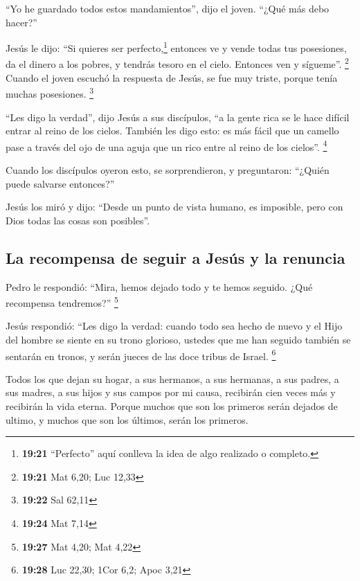  ``Yo he guardado todos estos mandamientos'', dijo el
joven. ``¿Qué más debo hacer?''

 Jesús le dijo: ``Si quieres ser perfecto,\footnote{\textbf{19:21}
  ``Perfecto'' aquí conlleva la idea de algo realizado o completo.}
entonces ve y vende todas tus posesiones, da el dinero a los pobres, y
tendrás tesoro en el cielo. Entonces ven y sígueme''. \footnote{\textbf{19:21}
  Mat 6,20; Luc 12,33}  Cuando el joven escuchó la
respuesta de Jesús, se fue muy triste, porque tenía muchas posesiones.
\footnote{\textbf{19:22} Sal 62,11}

 ``Les digo la verdad'', dijo Jesús a sus discípulos, ``a
la gente rica se le hace difícil entrar al reino de los cielos.
 También les digo esto: es más fácil que un camello pase
a través del ojo de una aguja que un rico entre al reino de los
cielos''. \footnote{\textbf{19:24} Mat 7,14}

 Cuando los discípulos oyeron esto, se sorprendieron, y
preguntaron: ``¿Quién puede salvarse entonces?''

 Jesús los miró y dijo: ``Desde un punto de vista humano,
es imposible, pero con Dios todas las cosas son posibles''.

\hypertarget{la-recompensa-de-seguir-a-jesuxfas-y-la-renuncia}{%
\subsection{La recompensa de seguir a Jesús y la
renuncia}\label{la-recompensa-de-seguir-a-jesuxfas-y-la-renuncia}}

 Pedro le respondió: ``Mira, hemos dejado todo y te hemos
seguido. ¿Qué recompensa tendremos?'' \footnote{\textbf{19:27} Mat 4,20;
  Mat 4,22}

 Jesús respondió: ``Les digo la verdad: cuando todo sea
hecho de nuevo y el Hijo del hombre se siente en su trono glorioso,
ustedes que me han seguido también se sentarán en tronos, y serán jueces
de las doce tribus de Israel. \footnote{\textbf{19:28} Luc 22,30; 1Cor
  6,2; Apoc 3,21}

 Todos los que dejan su hogar, a sus hermanos, a sus
hermanas, a sus padres, a sus madres, a sus hijos y sus campos por mi
causa, recibirán cien veces más y recibirán la vida eterna.
 Porque muchos que son los primeros serán dejados de
ultimo, y muchos que son los últimos, serán los primeros.

